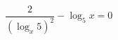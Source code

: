 \begin{ex}[type=equation]
	\begin{condition}
		\( \dfrac{2}{(\log_x 5)^2}-\log_5 x=0 \)
	\end{condition}
\end{ex}